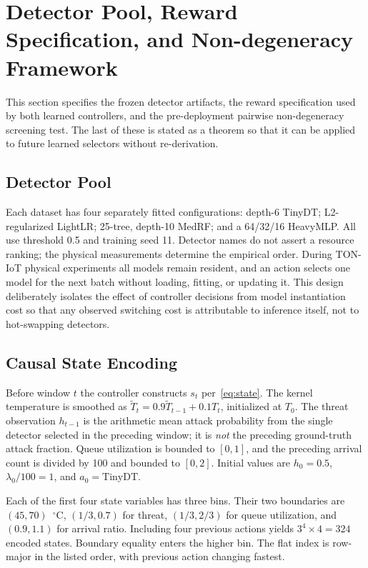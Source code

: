 \section{Detector Pool, Reward Specification, and Non-degeneracy Framework}
\label{sec:methods}
This section specifies the frozen detector artifacts, the reward specification used by both learned controllers, and the pre-deployment pairwise non-degeneracy screening test. The last of these is stated as a theorem so that it can be applied to future learned selectors without re-derivation.

\subsection{Detector Pool}
Each dataset has four separately fitted configurations: depth-6 TinyDT; L2-regularized LightLR; 25-tree, depth-10 MedRF; and a 64/32/16 HeavyMLP. All use threshold 0.5 and training seed 11. Detector names do not assert a resource ranking; the physical measurements determine the empirical order. During TON-IoT physical experiments all models remain resident, and an action selects one model for the next batch without loading, fitting, or updating it. This design deliberately isolates the effect of controller decisions from model instantiation cost so that any observed switching cost is attributable to inference itself, not to hot-swapping detectors.

\subsection{Causal State Encoding}
Before window $t$ the controller constructs $s_t$ per~\eqref{eq:state}. The kernel temperature is smoothed as $\widetilde T_t=0.9\widetilde T_{t-1}+0.1T_t$, initialized at $T_0$. The threat observation $h_{t-1}$ is the arithmetic mean attack probability from the single detector selected in the preceding window; it is \emph{not} the preceding ground-truth attack fraction. Queue utilization is bounded to $[0,1]$, and the preceding arrival count is divided by 100 and bounded to $[0,2]$. Initial values are $h_0=0.5$, $\lambda_0/100=1$, and $a_0=\text{TinyDT}$.

Each of the first four state variables has three bins. Their two boundaries are $(45,70)$~$^{\circ}$C, $(1/3,0.7)$ for threat, $(1/3,2/3)$ for queue utilization, and $(0.9,1.1)$ for arrival ratio. Including four previous actions yields $3^4\times 4=324$ encoded states. Boundary equality enters the higher bin. The flat index is row-major in the listed order, with previous action changing fastest.

